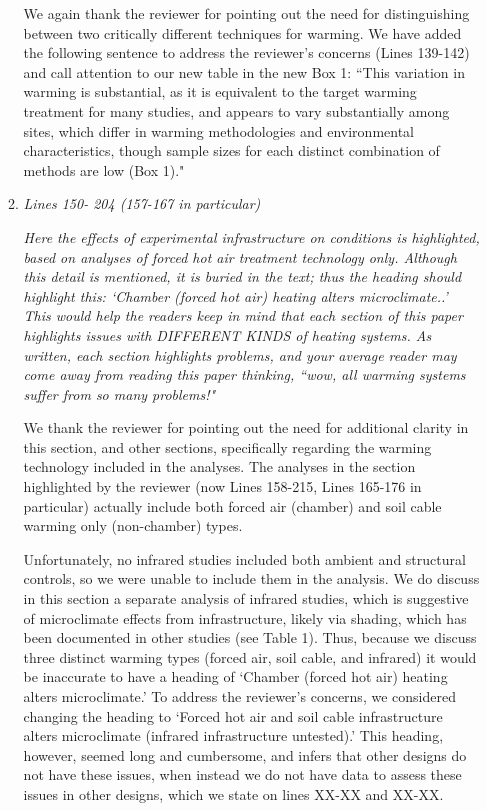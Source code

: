 \documentclass[11pt,a4paper]{letter}
\begin{document}
\begin{letter}{}
\begin{enumerate}
\begin{enumerate}
\par We again thank the reviewer for pointing out the need for distinguishing between two critically different techniques for warming. We have added the following sentence to address the reviewer's concerns (Lines 139-142) and call attention to our new table in the new Box 1: ``This variation in warming is substantial, as it is equivalent to the target warming treatment for many studies, and appears to vary substantially among sites, which differ in warming methodologies and environmental characteristics, though sample sizes for each distinct combination of methods are low (Box 1)." 

\item  \emph{ Lines 150- 204 (157-167 in particular)}
\par \emph{Here the effects of experimental infrastructure on conditions is highlighted,
based on analyses of forced hot air treatment technology only. Although this
detail is mentioned, it is buried in the text; thus the heading should highlight
this: `Chamber (forced hot air) heating alters microclimate..' This would help
the readers keep in mind that each section of this paper highlights issues with
DIFFERENT KINDS of heating systems. As written, each section highlights
problems, and your average reader may come away from reading this paper
thinking, ``wow, all warming systems suffer from so many problems!"}

\par We thank the reviewer for pointing out the need for additional clarity in this section, and other sections, specifically regarding the warming technology included in the analyses. The analyses in the section highlighted by the reviewer (now Lines 158-215, Lines 165-176 in particular) actually include both forced air (chamber) and soil cable warming only (non-chamber) types. 

\par Unfortunately, no infrared studies included both ambient and structural controls, so we were unable to include them in the analysis. We do discuss in this section a separate analysis of infrared studies, which is suggestive of microclimate effects from infrastructure, likely via shading, which has been documented in other studies (see Table 1). Thus, because we discuss three distinct warming types (forced air, soil cable, and infrared) it would be inaccurate to have a heading of `Chamber (forced hot air) heating alters microclimate.' To address the reviewer's concerns, we considered changing the heading to `Forced hot air and soil cable infrastructure alters microclimate (infrared infrastructure untested).' This heading, however, seemed long and cumbersome, and infers that other designs do not have these issues, when instead we do not have data to assess these issues in other designs, which we state on lines XX-XX and XX-XX. %


\end{enumerate}
\end{enumerate}
\end{letter}
\end{document}
